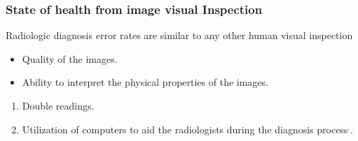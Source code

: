 \begin{frame}\frametitle{State of health from image visual Inspection}
\begin{block}{Radiologic diagnosis error rates are similar to any other human visual inspection\footnotemark[1]}
  \begin{itemize}
    \item Quality of the images.
    \item Ability to interpret the physical properties of the images.
  \end{itemize}
\end{block}
  \begin{enumerate}
    \item <2-> Double readings.
    \item <3-> Utilization of computers to aid the radiologists during the diagnosis process\footnotemark[2]$^,$\footnotemark[3].
  \end{enumerate}
\end{frame}


